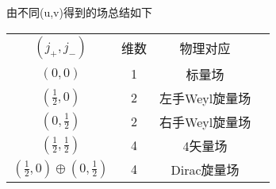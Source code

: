 \documentclass[aspectratio=1610,12pt]{beamer}
\begin{document}
\begin{frame}
    由不同(u,v)得到的场总结如下\cite{Mceey}
    \begin{table}
        \centering
        \begin{tabular}{|c|c|c|c|}
            $(j_+,j_-)$&维数&物理对应\\
            $(0,0)$&1&标量场\\
            $(\frac{1}{2},0)$&2&左手Weyl旋量场\\
            $(0,\frac{1}{2})$&2&右手Weyl旋量场\\
            $(\frac{1}{2},\frac{1}{2})$&4&4矢量场\\
            $(\frac{1}{2},0)\oplus (0,\frac{1}{2})$&4&Dirac旋量场\\
        \end{tabular}
    \end{table}
\end{frame}
\end{document}
